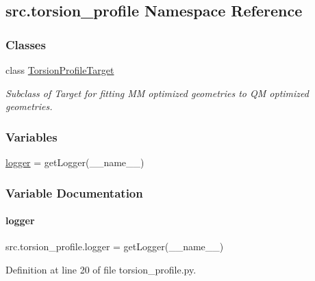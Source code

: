 \hypertarget{namespacesrc_1_1torsion__profile}{}\subsection{src.\+torsion\+\_\+profile Namespace Reference}
\label{namespacesrc_1_1torsion__profile}
\subsubsection*{Classes}
\begin{DoxyCompactItemize}
\item 
class \hyperlink{classsrc_1_1torsion__profile_1_1TorsionProfileTarget}{Torsion\+Profile\+Target}
\begin{DoxyCompactList}\small\item\em Subclass of Target for fitting MM optimized geometries to QM optimized geometries. \end{DoxyCompactList}\end{DoxyCompactItemize}
\subsubsection*{Variables}
\begin{DoxyCompactItemize}
\item 
\hyperlink{namespacesrc_1_1torsion__profile_a10dd885ebd9416a172664e416c31ad67}{logger} = get\+Logger(\+\_\+\+\_\+name\+\_\+\+\_\+)
\end{DoxyCompactItemize}


\subsubsection{Variable Documentation}
\mbox{\label{namespacesrc_1_1torsion__profile_a10dd885ebd9416a172664e416c31ad67}} 
\paragraph{\texorpdfstring{logger}{logger}}
{\footnotesize\ttfamily src.\+torsion\+\_\+profile.\+logger = get\+Logger(\+\_\+\+\_\+name\+\_\+\+\_\+)}



Definition at line 20 of file torsion\+\_\+profile.\+py.

